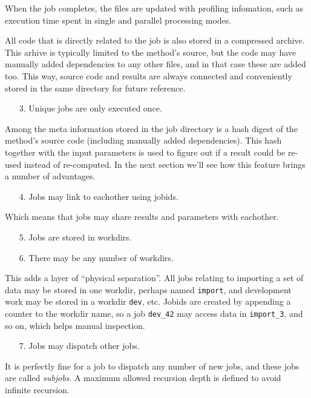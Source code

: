 \documentclass[a4paper]{article}
\begin{document}
When the job completes, the files are updated with profiling
infomation, such as execution time spent in single and parallel
processing modes.

All code that is directly related to the job is also stored in a
compressed archive.  This arhive is typically limited to the method's
source, but the code may have manually added dependencies to any other
files, and in that case these are added too.  This way, source code
and results are always connected and conveniently stored in the same
directory for future reference.
\begin{itemize}
\item[3.]  Unique jobs are only executed once.
\end{itemize}
Among the meta information stored in the job directory is a hash
digest of the method's source code (including manually added
dependencies).  This hash together with the input parameters is used
to figure out if a result could be re-used instead of re-computed.  In
the next section we'll see how this feature brings a number of
advantages.
\begin{itemize}
\item[4.]  Jobs may link to eachother using jobids.
\end{itemize}
Which means that jobs may share results and parameters with eachother.
\begin{itemize}
\item[5.]  Jobs are stored in workdirs.
\item[6.]  There may be any number of workdirs.
\end{itemize}
This adds a layer of ``physical separation''.  All jobs relating to
importing a set of data may be stored in one workdir, perhaps named
\texttt{import}, and development work may be stored in a workdir
\texttt{dev}, etc.  Jobids are created by appending a counter to the
workdir name, so a job \texttt{dev\_42} may access data in
\texttt{import\_3}, and so on, which helps manual inspection.
\begin{itemize}
\item[7.] Jobs may dispatch other jobs.
\end{itemize}
It is perfectly fine for a job to dispatch any number of new jobs, and
these jobs are called \textsl{subjobs}.  A maximum allowed recursion
depth is defined to avoid infinite recursion.
\clearpage
\end{document}
